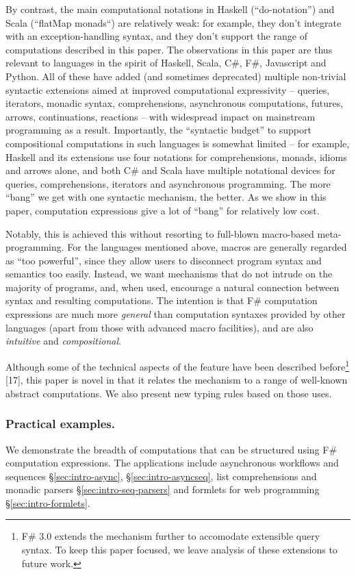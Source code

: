 \documentclass[runningheads,a4paper]{llncs}
\begin{document}
By contrast, the main computational notations in  Haskell (``do-notation'') and Scala (``flatMap monads``) 
are relatively weak: for example, they don't integrate with an exception-handling syntax, and they don't support the
range of computations described in this paper.  The observations in this paper are thus relevant to languages in the spirit of 
Haskell, Scala, C\#, F\#,  Javascript and Python. All of these have added (and sometimes deprecated) 
multiple non-trivial syntactic extensions aimed at improved computational expressivity -- queries, iterators, monadic syntax, 
comprehensions, asynchronous computations, futures, arrows, continuations, reactions -- with 
widespread impact on mainstream programming as a result. Importantly, the ``syntactic budget'' to support 
compositional computations in such languages is somewhat limited -- for example, Haskell and 
its extensions use four notations for  comprehensions, monads, idioms and arrows alone, and both C\# and Scala
have multiple notational devices for queries, comprehensions, iterators and asynchronous programming. 
The more ``bang'' we get with one syntactic mechanism, the better. As we show in this paper, computation expressions
give a lot of ``bang'' for relatively low cost.

Notably, this is achieved this without resorting to full-blown macro-based meta-programming. For the languages
mentioned above, macros are generally regarded as ``too powerful'', since they allow users to disconnect program syntax and 
semantics too easily. Instead, we want mechanisms that do not intrude on the majority of programs, and, when used, 
encourage a natural connection between syntax and resulting computations. 
The intention is that F\# computation expressions are much more \emph{general} than computation syntaxes 
provided by other languages (apart from those with advanced macro facilities), and are also
\emph{intuitive} and \emph{compositional}.   

Although some of the technical aspects of the feature have been described before\footnote{F\# 3.0 extends the 
mechanism further to accomodate extensible query syntax. To keep this paper focused, we leave analysis 
of these extensions to future work.} [17], this paper is novel in that it relates the mechanism to 
a range of well-known abstract computations. We also present new typing rules based on those uses.

\subsubsection{Practical examples.} 
We demonstrate the breadth of computations that can be structured using F\# computation expressions.
The applications include asynchronous workflows and sequences \S\ref{sec:intro-async}, 
\S\ref{sec:intro-asyncseq}, list comprehensions and monadic parsers \S\ref{sec:intro-seq-parsers}
and formlets for web programming \S\ref{sec:intro-formlets}.
\end{document}
